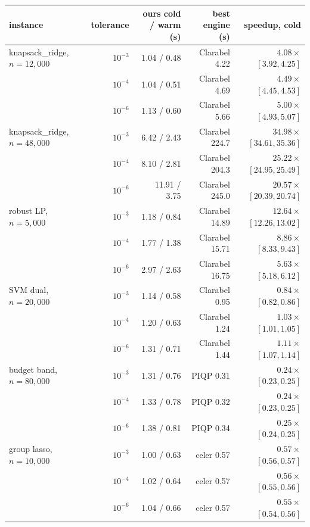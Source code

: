 \documentclass[11pt]{article}
\begin{document}
\begin{center}
\scriptsize
\begin{tabular}{lrrrr}
\toprule
instance & tolerance & ours cold / warm (s) & best engine (s) & speedup, cold \\
\midrule
knapsack\_ridge, $n = 12{,}000$ & $10^{-3}$ & 1.04 / 0.48 & Clarabel 4.22 & $4.08\times$ $[3.92, 4.25]$ \\
 & $10^{-4}$ & 1.04 / 0.51 & Clarabel 4.69 & $4.49\times$ $[4.45, 4.53]$ \\
 & $10^{-6}$ & 1.13 / 0.60 & Clarabel 5.66 & $5.00\times$ $[4.93, 5.07]$ \\
knapsack\_ridge, $n = 48{,}000$ & $10^{-3}$ & 6.42 / 2.43 & Clarabel 224.7 & $34.98\times$ $[34.61, 35.36]$ \\
 & $10^{-4}$ & 8.10 / 2.81 & Clarabel 204.3 & $25.22\times$ $[24.95, 25.49]$ \\
 & $10^{-6}$ & 11.91 / 3.75 & Clarabel 245.0 & $20.57\times$ $[20.39, 20.74]$ \\
robust LP, $n = 5{,}000$ & $10^{-3}$ & 1.18 / 0.84 & Clarabel 14.89 & $12.64\times$ $[12.26, 13.02]$ \\
 & $10^{-4}$ & 1.77 / 1.38 & Clarabel 15.71 & $8.86\times$ $[8.33, 9.43]$ \\
 & $10^{-6}$ & 2.97 / 2.63 & Clarabel 16.75 & $5.63\times$ $[5.18, 6.12]$ \\
SVM dual, $n = 20{,}000$ & $10^{-3}$ & 1.14 / 0.58 & Clarabel 0.95 & $0.84\times$ $[0.82, 0.86]$ \\
 & $10^{-4}$ & 1.20 / 0.63 & Clarabel 1.24 & $1.03\times$ $[1.01, 1.05]$ \\
 & $10^{-6}$ & 1.31 / 0.71 & Clarabel 1.44 & $1.11\times$ $[1.07, 1.14]$ \\
budget band, $n = 80{,}000$ & $10^{-3}$ & 1.31 / 0.76 & PIQP 0.31 & $0.24\times$ $[0.23, 0.25]$ \\
 & $10^{-4}$ & 1.33 / 0.78 & PIQP 0.32 & $0.24\times$ $[0.23, 0.25]$ \\
 & $10^{-6}$ & 1.38 / 0.81 & PIQP 0.34 & $0.25\times$ $[0.24, 0.25]$ \\
group lasso, $n = 10{,}000$ & $10^{-3}$ & 1.00 / 0.63 & celer 0.57 & $0.57\times$ $[0.56, 0.57]$ \\
 & $10^{-4}$ & 1.02 / 0.64 & celer 0.57 & $0.56\times$ $[0.55, 0.56]$ \\
 & $10^{-6}$ & 1.04 / 0.66 & celer 0.57 & $0.55\times$ $[0.54, 0.56]$ \\
\bottomrule
\end{tabular}
\end{center}
\end{document}
